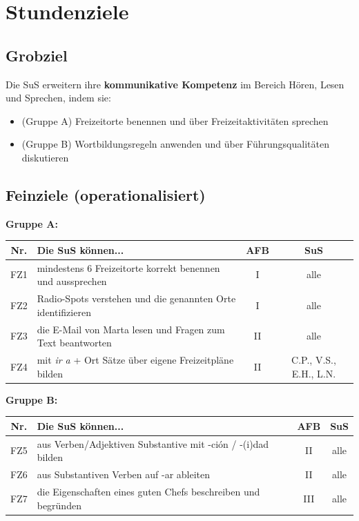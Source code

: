 \documentclass[11pt,a4paper]{article}
\begin{document}
\section{Stundenziele}

\subsection{Grobziel}
Die SuS erweitern ihre \textbf{kommunikative Kompetenz} im Bereich Hören, Lesen und Sprechen, indem sie:
\begin{itemize}
    \item (Gruppe A) Freizeitorte benennen und über Freizeitaktivitäten sprechen
    \item (Gruppe B) Wortbildungsregeln anwenden und über Führungsqualitäten diskutieren
\end{itemize}

\subsection{Feinziele (operationalisiert)}

\textbf{Gruppe A:}
\begin{tabular}{|c|p{7.5cm}|c|c|}
\hline
\textbf{Nr.} & \textbf{Die SuS können...} & \textbf{AFB} & \textbf{SuS} \\
\hline
FZ1 & mindestens 6 Freizeitorte korrekt benennen und aussprechen & I & alle \\
\hline
FZ2 & Radio-Spots verstehen und die genannten Orte identifizieren & I & alle \\
\hline
FZ3 & die E-Mail von Marta lesen und Fragen zum Text beantworten & II & alle \\
\hline
FZ4 & mit \textit{ir a} + Ort Sätze über eigene Freizeitpläne bilden & II & C.P., V.S., E.H., L.N. \\
\hline
\end{tabular}

\vspace{1em}

\textbf{Gruppe B:}
\begin{tabular}{|c|p{7.5cm}|c|c|}
\hline
\textbf{Nr.} & \textbf{Die SuS können...} & \textbf{AFB} & \textbf{SuS} \\
\hline
FZ5 & aus Verben/Adjektiven Substantive mit -ción / -(i)dad bilden & II & alle \\
\hline
FZ6 & aus Substantiven Verben auf -ar ableiten & II & alle \\
\hline
FZ7 & die Eigenschaften eines guten Chefs beschreiben und begründen & III & alle \\
\hline
\end{tabular}
\end{document}
